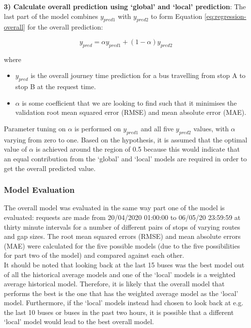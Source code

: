 \textbf{3) Calculate overall prediction using `global' and `local' prediction}: The last part of the model combines $y_{pred1}$ with $y_{pred2}$ to form Equation \ref{eq:regression-overall} for the overall prediction:

\begin{equation}
\label{eq:regression-overall}
    y_{pred} = \alpha y_{pred1} + (1 - \alpha)y_{pred2}
\end{equation}

where 
\begin{itemize}
    \item $y_{pred}$ is the overall journey time prediction for a bus travelling from stop A to stop B at the request time.
    \item $\alpha$ is some coefficient that we are looking to find such that it minimises the validation root mean squared error (RMSE) and mean absolute error (MAE). 
\end{itemize}

Parameter tuning on $\alpha$ is performed on $y_{pred1}$ and all five $y_{pred2}$ values, with $\alpha$ varying from zero to one. Based on the hypothesis, it is assumed that the optimal value of $\alpha$ is achieved around the region of 0.5 because this would indicate that an equal contribution from the `global' and `local' models are required in order to get the overall predicted value.

\subsubsection{Model Evaluation}

The overall model was evaluated in the same way part one of the model is evaluated: requests are made from 20/04/2020 01:00:00 to 06/05/20 23:59:59 at thirty minute intervals for a number of different pairs of stops of varying routes and gap sizes. The root mean squared errors (RMSE) and mean absolute errors (MAE) were calculated for the five possible models (due to the five possibilities for part two of the model) and compared against each other. \\

It should be noted that looking back at the last 15 buses was the best model out of all the historical average models and one of the `local' models is a weighted average historical model. Therefore, it is likely that the overall model that performs the best is the one that has the weighted average model as the `local' model. Furthermore, if the `local' models instead had chosen to look back at e.g. the last 10 buses or buses in the past two hours, it is possible that a different `local' model would lead to the best overall model.

